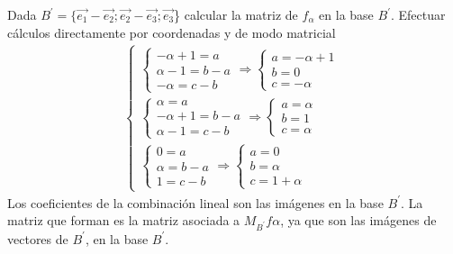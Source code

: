 \documentclass[11pt]{article}
\begin{document}
\begin{question}
\begin{subquestion}{Dada $B^{'}=\{\Vec{e_{1}}-\Vec{e_{2}};\Vec{e_{2}}-\Vec{e_{3}};\Vec{e_{3}}$\} calcular la matriz de $f_{\alpha}$ en la base $B^{'}$. Efectuar cálculos directamente por coordenadas y de modo matricial}
{\begin{align*}
\begin{cases}
                    \begin{cases}
                        -\alpha+1=a\\
                        \alpha-1=b-a\\
                        -\alpha=c-b
                    \end{cases}
                    \Rightarrow
                    \begin{cases}
                        a=-\alpha+1\\
                        b=0\\
                        c=-\alpha
                    \end{cases}\\
                    \begin{cases}
                        \alpha=a\\
                        -\alpha+1=b-a\\
                        \alpha-1=c-b
                    \end{cases}
                    \Rightarrow
                    \begin{cases}
                        a=\alpha\\
                        b=1\\
                        c=\alpha
                    \end{cases}\\
                    \begin{cases}
                        0=a\\
                        \alpha=b-a\\
                        1=c-b
                    \end{cases}
                    \Rightarrow
                    \begin{cases}
                        a=0\\
                        b=\alpha\\
                        c=1+\alpha
                    \end{cases}
                \end{cases}
            \end{align*}
            Los coeficientes de la combinación lineal son las imágenes en la base $B^{'}$.
            \newline
            La matriz que forman es la matriz asociada a $M_{B^{'}}f{\alpha}$, ya que son las imágenes de vectores de $B^{'}$, en la base $B^{'}$.
            \begin{equation*}

\end{equation*}}
\end{subquestion}
\end{question}
\end{document}
